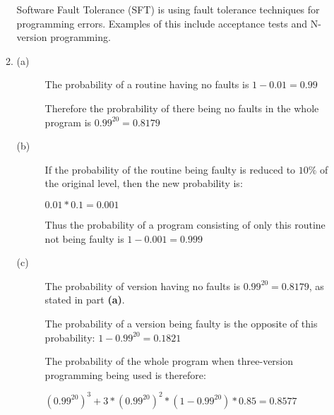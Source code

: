 \documentclass[a4paper,12pt]{article}
\begin{document}
\begin{enumerate}
\begin{enumerate}
                Software Fault Tolerance (SFT) is using fault tolerance techniques for programming errors. Examples of this include acceptance tests and N-version programming.

                \item
                    \begin{description}
                        \item[(a)] The probability of a routine having no faults is $1 - 0.01 = 0.99$

                        Therefore the probrability of there being no faults in the whole program is $0.99^{20} = 0.8179$

                        \item[(b)] If the probability of the routine being faulty is reduced to $10\%$ of the original level, then the new probability is:

                        $0.01 * 0.1 = 0.001$

                        Thus the probability of a program consisting of only this routine not being faulty is $1 - 0.001 = 0.999$

                        \item[(c)] The probability of version having no faults is $0.99^{20} = 0.8179$, as stated in part \textbf{(a)}.

                        The probability of a version being faulty is the opposite of this probability: $1 - 0.99^{20} = 0.1821$

                        The probability of the whole program when three-version programming being used is therefore:

                        $(0.99^{20})^3 + 3 * (0.99^{20})^2 * (1 - 0.99^{20}) * 0.85 = 0.8577$
                    \end{description}
            \end{enumerate}

    \end{enumerate}
\end{document}
